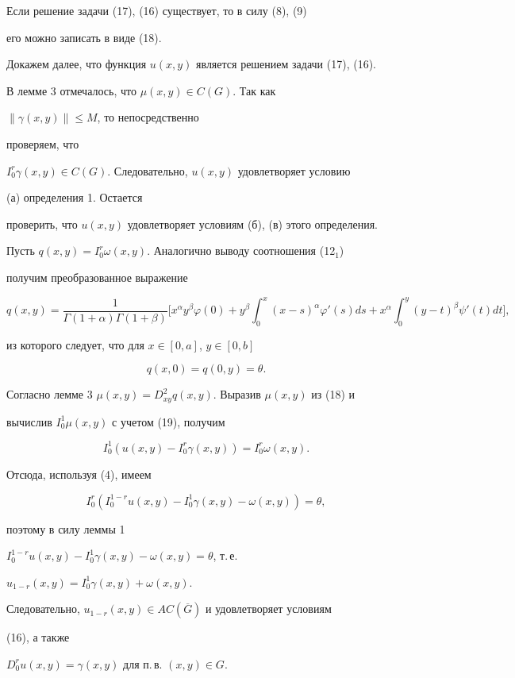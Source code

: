 \begin{pf} Если решение задачи (17), (16) существует, то в силу (8), (9) 


его можно записать в виде (18). 


 


Докажем далее, что функция $u(x,y)$ является решением задачи (17), (16). 


В лемме 3 отмечалось, что $\mu(x,y)\in C(G)$. Так как 


$\|\gamma(x,y)\|\le M$, то непосредственно 


проверяем, что 


$I_0^r\gamma(x,y)\in C(G)$. Следовательно, $u(x,y)$ удовлетворяет условию 


(а) определения 1. Остается 


проверить, что $u(x,y)$ удовлетворяет условиям (б), (в) этого определения. 


Пусть $q(x,y)=I_0^r\omega(x,y)$. Аналогично выводу соотношения (12${}_1$) 


получим преобразованное выражение 


$$ 


q(x,y)= 


\frac{1}{\Gamma(1+\alpha)\Gamma(1+\beta)}\biggl[ 


x^\alpha y^\beta\varphi(0)+y^\beta 


\int^x_0(x-s)^\alpha\varphi'(s)ds+x^\alpha 


\int^y_0(y-t)^\beta\psi'(t)dt\biggr], 


$$ 


из которого следует, что для $x\in[0,a]$, $y\in[0,b]$ 


\begin{equation} 


q(x,0)=q(0,y)=\theta.\tag{19} 


\end{equation} 


Согласно лемме 3 $\mu(x,y)=D^2_{xy}q(x,y)$. Выразив $\mu(x,y)$ из (18) и 


вычислив $I_0^1\mu(x,y)$ с учетом (19), получим 


$$ 


I_0^1(u(x,y)-I_0^r\gamma(x,y))=I_0^r\omega(x,y). 


$$ 


Отсюда, используя (4), имеем 


$$ 


I_0^r(I_0^{1-r}u(x,y)-I_0^1\gamma(x,y)-\omega(x,y))=\theta, 


$$ 


поэтому в силу леммы 1\; 


$I_0^{1-r}u(x,y)-I_0^1\gamma(x,y)-\omega(x,y)=\theta$, т.\,е. 


$u_{1-r}(x,y)=I_0^1\gamma(x,y)+\omega(x,y)$. 


Следовательно, $u_{1-r}(x,y)\in AC(\overline G)$ и удовлетворяет условиям 


(16), а также 


$D_0^ru(x,y)=\gamma(x,y)$ для п.\,в. $(x,y)\in G$. 


\end{pf} 


